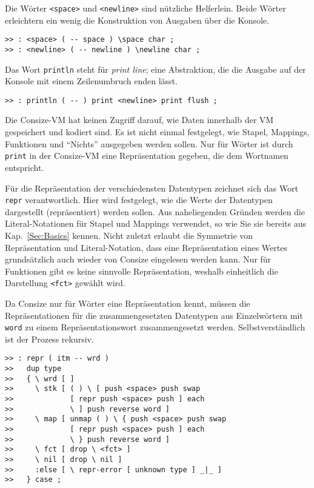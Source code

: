 Die Wörter \verb|<space>| und \verb|<newline>| sind nützliche Helferlein. Beide Wörter erleichtern ein wenig die Konstruktion von Ausgaben über die Konsole. 

\begin{verbatim}
>> : <space> ( -- space ) \space char ;
>> : <newline> ( -- newline ) \newline char ;
\end{verbatim}

Das Wort \verb|println| steht für \emph{print line}; eine Abstraktion, die die Ausgabe auf der Konsole mit einem Zeilenumbruch enden lässt.

\begin{verbatim}
>> : println ( -- ) print <newline> print flush ;
\end{verbatim}

Die Consize-VM hat keinen Zugriff darauf, wie Daten innerhalb der VM gespeichert und kodiert sind. Es ist nicht einmal festgelegt, wie Stapel, Mappings, Funktionen und "`Nichts"' ausgegeben werden sollen. Nur für Wörter ist durch \verb|print| in der Consize-VM eine Repräsentation gegeben, die dem Wortnamen entspricht.

Für die Repräsentation der verschiedensten Datentypen zeichnet sich das Wort \verb|repr| verantwortlich. Hier wird festgelegt, wie die Werte der Datentypen dargestellt (repräsentiert) werden sollen. Aus naheliegenden Gründen werden die Literal-Notationen für Stapel und Mappings verwendet, so wie Sie sie bereits aus Kap.~\ref{Sec:Basics} kennen. Nicht zuletzt erlaubt die Symmetrie von Repräsentation und Literal-Notation, dass eine Repräsentation eines Wertes grundsätzlich auch wieder von Consize eingelesen werden kann. Nur für Funktionen gibt es keine sinnvolle Repräsentation, weshalb einheitlich die Darstellung \verb|<fct>| gewählt wird.

Da Consize nur für Wörter eine Repräsentation kennt, müssen die Repräsentationen für die zusammengesetzten Datentypen aus Einzelwörtern mit \verb|word| zu einem Repräsentationswort zusammengesetzt werden. Selbstverständlich ist der Prozess rekursiv.

\begin{verbatim}
>> : repr ( itm -- wrd ) 
>>   dup type
>>   { \ wrd [ ]
>>     \ stk [ ( ) \ [ push <space> push swap 
>>             [ repr push <space> push ] each
>>             \ ] push reverse word ]
>>     \ map [ unmap ( ) \ { push <space> push swap
>>             [ repr push <space> push ] each
>>             \ } push reverse word ]
>>     \ fct [ drop \ <fct> ]
>>     \ nil [ drop \ nil ]
>>     :else [ \ repr-error [ unknown type ] _|_ ]
>>   } case ;
\end{verbatim}

